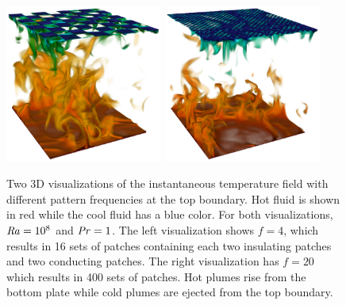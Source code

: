\documentclass{jfm}
\newcommand\Pran{\mbox{\textit{Pr}}} %
\newcommand\Ray{\mbox{\textit{Ra}}}  %
\begin{document}
\begin{figure}
\centering%
\includegraphics[width=0.46\textwidth]{fig11a.eps}
\qquad
\includegraphics[width=0.46\textwidth]{fig11b.eps}
\caption{%
Two 3D visualizations of the instantaneous temperature field with
different pattern frequencies at the top boundary. Hot fluid is shown in
red while the cool fluid has a blue color. For both visualizations,
$\Ray=10^8$ and $\Pran=1$. The left visualization shows $f=4$, which
results in 16 sets of patches containing each two insulating patches and
two conducting patches. The right visualization has $f=20$ which results
in 400 sets of patches. Hot plumes rise from the bottom plate while cold
plumes are ejected from the top boundary.}
\label{figure13}
\end{figure}
\end{document}
